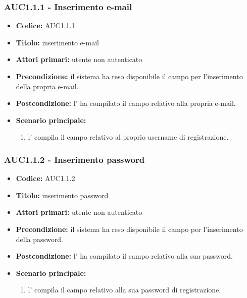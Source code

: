 \documentclass[casi-duso]{subfiles}
\begin{document}
\subsubsection{AUC1.1.1 - Inserimento e-mail}%
\label{subsub:AUC1.1.1}
\begin{itemize}
  \item \textbf{Codice:} AUC1.1.1
  \item \textbf{Titolo:} inserimento e-mail
  \item \textbf{Attori primari:} utente non autenticato
  \item \textbf{Precondizione:} il sistema ha reso disponibile il campo per l'inserimento della propria e-mail.
  \item \textbf{Postcondizione:} l' ha compilato il campo relativo alla propria e-mail.
  \item \textbf{Scenario principale:} 
  \begin{enumerate}
    \item l' compila il campo relativo al proprio username di registrazione.
  \end{enumerate}
\end{itemize}

\subsubsection{AUC1.1.2 - Inserimento password}%
\label{subsub:AUC1.1.2}
\begin{itemize}
  \item \textbf{Codice:} AUC1.1.2
  \item \textbf{Titolo:} inserimento password
  \item \textbf{Attori primari:} utente non autenticato
  \item \textbf{Precondizione:} il sistema ha reso disponibile il campo per l'inserimento della password.
  \item \textbf{Postcondizione:} l' ha compilato il campo relativo alla sua password.
  \item \textbf{Scenario principale:}
  \begin{enumerate}
    \item l' compila il campo relativo alla sua password di registrazione.
  \end{enumerate}
\end{itemize}
\end{document}
